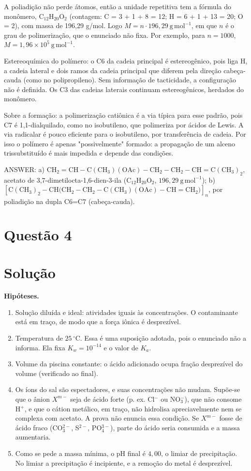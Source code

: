 \documentclass{article}%
\begin{document}
A poliadição não perde átomos, então a unidade repetitiva tem a fórmula do monômero, $\mathrm{C_{12}H_{20}O_2}$ (contagem: C = 3 + 1 + 8 = 12; H = 6 + 1 + 13 = 20; O = 2), com massa de 196,29 g/mol. Logo $M=n\cdot 196{,}29\ \mathrm{g\,mol^{-1}}$, em que $n$ é o grau de polimerização, que o enunciado não fixa. Por exemplo, para $n=1000$, $M=1{,}96\times10^{5}\ \mathrm{g\,mol^{-1}}$.

Estereoquímica do polímero: o C6 da cadeia principal é estereogênico, pois liga H, a cadeia lateral e dois ramos da cadeia principal que diferem pela direção cabeça-cauda (como no polipropileno). Sem informação de tacticidade, a configuração não é definida. Os C3 das cadeias laterais continuam estereogênicos, herdados do monômero.

Sobre a formação: a polimerização catiônica é a via típica para esse padrão, pois C7 é 1,1-dialquilado, como no isobutileno, que polimeriza por ácidos de Lewis. A via radicalar é pouco eficiente para o isobutileno, por transferência de cadeia. Por isso o polímero é apenas "possivelmente" formado: a propagação de um alceno trissubstituído é mais impedida e depende das condições.

ANSWER: a) $\mathrm{CH_2{=}CH{-}C(CH_3)(OAc){-}CH_2{-}CH_2{-}CH{=}C(CH_3)_2}$, acetato de 3,7-dimetilocta-1,6-dien-3-ila ($\mathrm{C_{12}H_{20}O_2}$, $196{,}29\ \mathrm{g\,mol^{-1}}$); b) $\left[\mathrm{C(CH_3)_2{-}CH\bigl(CH_2{-}CH_2{-}C(CH_3)(OAc){-}CH{=}CH_2\bigr)}\right]_n$, por poliadição na dupla C6=C7 (cabeça-cauda).%
\newpage%
\section*{Questão 4}

\section*{Solução}

\textbf{Hipóteses.}
\begin{enumerate}
\item Solução diluída e ideal: atividades iguais às concentrações. O contaminante está em traço, de modo que a força iônica é desprezível.
\item Temperatura de $25\,^{\circ}\text{C}$. Essa é uma suposição adotada, pois o enunciado não a informa. Ela fixa $K_w = 10^{-14}$ e o valor de $K_a$.
\item Volume da piscina constante: o ácido adicionado ocupa fração desprezível do volume (verificado ao final).
\item Os íons do sal são espectadores, e suas concentrações não mudam. Supõe-se que o ânion $X^{m-}$ seja de ácido forte (p. ex. Cl$^-$ ou NO$_3^-$), que não consome H$^+$, e que o cátion metálico, em traço, não hidrolisa apreciavelmente nem se complexa com acetato. A prova não enuncia essa condição. Se $X^{m-}$ fosse de ácido fraco (CO$_3^{2-}$, S$^{2-}$, PO$_4^{3-}$), parte do ácido seria consumida e a massa aumentaria.
\item Como se pede a massa mínima, o pH final é $4{,}00$, o limiar de precipitação. No limiar a precipitação é incipiente, e a remoção do metal é desprezível.
\end{enumerate}
\end{document}
